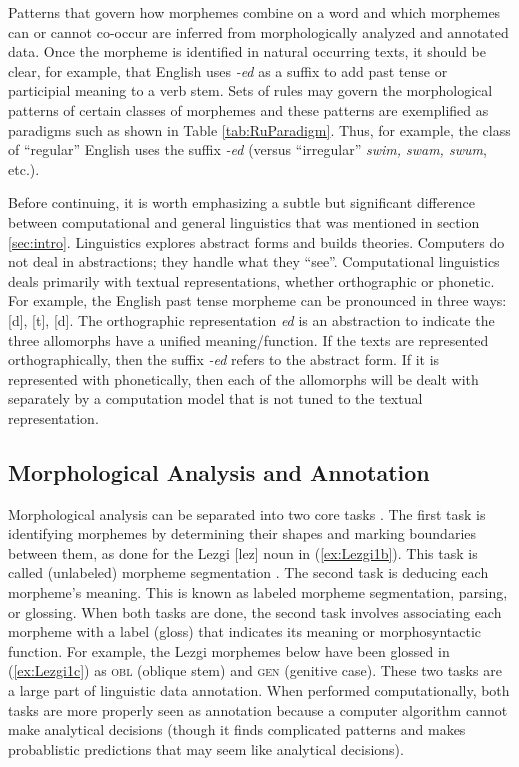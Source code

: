\documentclass[12pt]{article}
\begin{document}
Patterns that govern how morphemes combine on a word and which morphemes can or cannot co-occur are inferred from morphologically analyzed and annotated data. Once the morpheme is identified in natural occurring texts, it should be clear, for example, that English uses \textit{-ed} as a suffix to add past tense or participial meaning to a verb stem. Sets of rules may govern the morphological patterns of certain classes of morphemes and these patterns are exemplified as paradigms such as shown in Table \ref{tab:RuParadigm}. Thus, for example, the class of ``regular'' English uses the suffix \textit{-ed} (versus ``irregular'' \textit{swim, swam, swum}, etc.).

Before continuing, it is worth emphasizing a subtle but significant difference between computational and general linguistics that was mentioned in section \ref{sec:intro}. Linguistics explores abstract forms and builds theories. Computers do not deal in abstractions; they handle what they ``see''. Computational linguistics deals primarily with textual representations, whether orthographic or phonetic. For example, the English past tense morpheme can be pronounced in three ways: [d], [t], [{\textbari}d]. The orthographic representation \textit{ed} is an abstraction to indicate the three allomorphs have a unified meaning/function. If the texts are represented orthographically, then the suffix \textit{-ed} refers to the abstract form. If it is represented with phonetically, then each of the allomorphs will be dealt with separately by a computation model that is not tuned to the textual representation. 

\subsection{Morphological Analysis and Annotation}
\label{analysis}

Morphological analysis can be separated into two core tasks \cite{cotterell_labeled_2015,hammarstrom_unsupervised_2011,nicolai_morphological_2017,palmer_semi-automated_2009}. The first task is identifying morphemes by determining their shapes and marking boundaries between them, as done for the Lezgi [lez] noun in (\ref{ex:Lezgi1b}). This task is called (unlabeled) morpheme segmentation \cite{creutz_unsupervised_2007,snyder_unsupervised_2008}. The second task is deducing each morpheme's meaning. This is known as labeled morpheme segmentation, parsing, or glossing. When both tasks are done, the second task involves associating each morpheme with a label (gloss) that indicates its meaning or morphosyntactic function. For example, the Lezgi morphemes below have been glossed in (\ref{ex:Lezgi1c}) as \textsc{obl} (oblique stem) and \textsc{gen} (genitive case). These two tasks are a large part of linguistic data annotation. When performed computationally, both tasks are more properly seen as annotation because a computer algorithm cannot make analytical decisions (though it finds complicated patterns and makes probablistic predictions that may seem like analytical decisions).
\end{document}
